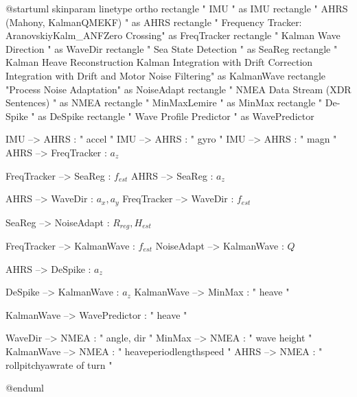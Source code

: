 \documentclass{article}
\begin{document}
\begin{plantuml}
@startuml
skinparam linetype ortho
rectangle "                         IMU                          " as IMU
rectangle "                                                                AHRS (Mahony, KalmanQMEKF)                                                     " as AHRS
rectangle "    Frequency Tracker:     \n\n  Aranovskiy\n  Kalm_ANF\n  Zero Crossing" as FreqTracker
rectangle "    Kalman Wave Direction  " as WaveDir
rectangle "         Sea State Detection          " as SeaReg
rectangle "                             Kalman Heave Reconstruction                   \n\n         Kalman Integration with Drift Correction         \nKalman Integration with Drift and Motor Noise Filtering" as KalmanWave
rectangle "Process Noise Adaptation" as NoiseAdapt
rectangle "                         NMEA Data Stream (XDR Sentences)                      " as NMEA
rectangle "         MinMaxLemire      " as MinMax
rectangle "   De-Spike  " as DeSpike
rectangle " Wave Profile Predictor " as WavePredictor

IMU --> AHRS : " accel "
IMU --> AHRS : " gyro "
IMU --> AHRS : " magn "
AHRS --> FreqTracker : $a_{z}$

FreqTracker --> SeaReg : $f_{est}$
AHRS --> SeaReg : $a_{z}$

AHRS --> WaveDir : $a_{x}, a_{y}$
FreqTracker --> WaveDir : $f_{est}$

SeaReg --> NoiseAdapt : $R_{reg}, H_{est}$

FreqTracker --> KalmanWave : $f_{est}$
NoiseAdapt --> KalmanWave : $Q$

AHRS --> DeSpike : $a_{z}$

DeSpike --> KalmanWave : $a_{z}$
KalmanWave --> MinMax : " heave "

KalmanWave --> WavePredictor : " heave "

WaveDir --> NMEA : " angle, dir "
MinMax --> NMEA : " wave height "
KalmanWave --> NMEA : " heave\n period\n length\n speed "
AHRS --> NMEA : " roll\n pitch\n yaw\n rate of turn "

@enduml
\end{plantuml}
\end{document}
